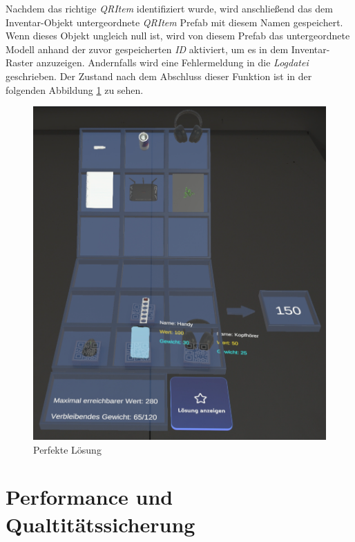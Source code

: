 Nachdem das richtige \textit{QRItem} identifiziert wurde, wird anschließend das dem Inventar-Objekt untergeordnete
\textit{QRItem} Prefab mit diesem Namen gespeichert. Wenn dieses Objekt ungleich null ist, wird von diesem Prefab das
untergeordnete Modell anhand der zuvor gespeicherten \textit{ID} aktiviert, um es in dem Inventar-Raster anzuzeigen.
Andernfalls wird eine Fehlermeldung in die \textit{Logdatei} geschrieben. Der Zustand nach dem Abschluss dieser Funktion
ist in der folgenden Abbildung \ref{fig:perfSolUserPOV} zu sehen.
\begin{figure}[H]
    \centering
    \includegraphics[scale=0.8]{images/perfSolUserPOV}
    \caption{Perfekte Lösung}
    \label{fig:perfSolUserPOV}
\end{figure}

\section{Performance und Qualtitätssicherung} 
